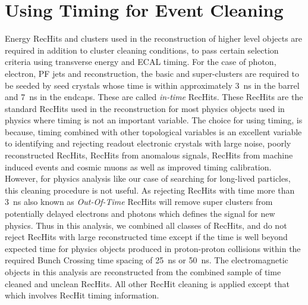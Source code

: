 \section{Using Timing for Event Cleaning}
Energy RecHits and clusters used in the reconstruction of higher level objects are required in addition to cluster cleaning conditions, to pass certain selection criteria using transverse energy and ECAL timing. For the case of photon, electron, PF jets and \MET reconstruction, the basic and super-clusters are required to be seeded by seed crystals whose time is within approximately 3~ns in the barrel and 7~ns in the endcaps. These are called \textit{in-time} RecHits. These RecHits are the standard RecHits used in the reconstruction for most physics objects used in physics where timing is not an important variable. The choice for using timing, is because, timing combined with other topological variables is an excellent variable to identifying and rejecting readout electronic crystals with large noise, poorly reconstructed RecHits, RecHits from anomalous signals, RecHits from machine induced events and cosmic muons as well as improved timing calibration. 
However, for physics analysis like our case of searching for long-lived particles, this cleaning procedure is not useful. As rejecting RecHits with time more than 3~ns also known as \textit{Out-Of-Time} RecHits will remove super clusters from potentially delayed electrons and photons which defines the signal for new physics.
Thus in this analysis, we combined all classes of RecHits, and do not reject RecHits with large reconstructed time except if the time is well beyond expected time for physics objects produced in proton-proton collisions within the required Bunch Crossing time spacing of 25~ns or 50~ns.
The electromagnetic objects in this analysis are reconstructed from the combined sample of time cleaned and unclean RecHits. All other RecHit cleaning is applied except that which involves RecHit timing information.

